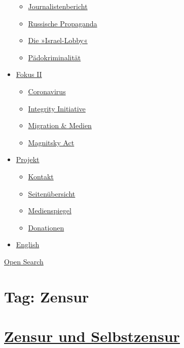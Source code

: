\begin{itemize}
  \begin{itemize}
  \tightlist
  \item
    \href{https://swprs.org/bericht-eines-journalisten/}{Journalistenbericht}
  \item
    \href{https://swprs.org/russische-propaganda/}{Russische Propaganda}
  \item
    \href{https://swprs.org/die-israel-lobby-fakten-und-mythen/}{Die
    »Israel-Lobby«}
  \item
    \href{https://swprs.org/geopolitik-und-paedokriminalitaet/}{Pädokriminalität}
  \end{itemize}
\item
  \href{https://swprs.org/migration-und-medien/}{Fokus II}

  \begin{itemize}
  \tightlist
  \item
    \href{https://swprs.org/covid-19-hinweis-ii/}{Coronavirus}
  \item
    \href{https://swprs.org/die-integrity-initiative/}{Integrity
    Initiative}
  \item
    \href{https://swprs.org/migration-und-medien/}{Migration \& Medien}
  \item
    \href{https://swprs.org/der-fall-magnitsky/}{Magnitsky Act}
  \end{itemize}
\item
  \href{https://swprs.org/kontakt/}{Projekt}

  \begin{itemize}
  \tightlist
  \item
    \href{https://swprs.org/kontakt/}{Kontakt}
  \item
    \href{https://swprs.org/uebersicht/}{Seitenübersicht}
  \item
    \href{https://swprs.org/medienspiegel/}{Medienspiegel}
  \item
    \href{https://swprs.org/donationen/}{Donationen}
  \end{itemize}
\item
  \href{https://swprs.org/contact/}{English}
\end{itemize}

\protect\hyperlink{}{Open Search}

\hypertarget{tag-zensur}{%
\section{Tag: Zensur}\label{tag-zensur}}

\hypertarget{zensur-und-selbstzensur}{%
\section{\texorpdfstring{\href{https://swprs.org/2017/03/01/zensur-in-schweizer-medien/}{Zensur
und
Selbstzensur}}{Zensur und Selbstzensur}}\label{zensur-und-selbstzensur}}

